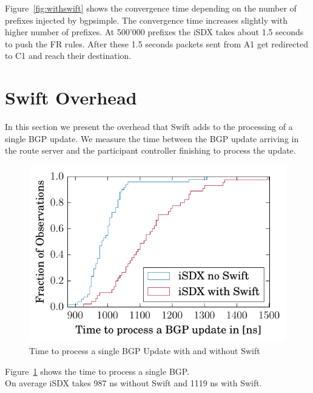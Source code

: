 Figure~\ref{fig:withswift} shows the convergence time depending on the number of prefixes injected by bgpsimple.
The convergence time increases slightly with higher number of prefixes. At 500'000 prefixes the iSDX takes about 1.5 seconds to push the FR rules. After these 1.5 seconds packets sent from A1 get redirected to C1 and reach their destination. \\

\section{\label{chapter4:Swift overhead}Swift Overhead}

In this section we present the overhead that Swift adds to the processing of a single BGP update. We measure the time between the BGP update arriving in the route server and the participant controller finishing to process the update. 

\begin{figure}[h]
\center
\includegraphics[scale = 1]{Figures/results_overhead.pdf}
\caption{Time to process a single BGP Update with and without Swift}
\label{fig:swiftoverhead}
\end{figure}

Figure~\ref{fig:swiftoverhead} shows the time to process a single BGP. \\On average iSDX takes 987 ns without Swift and 1119 ns with Swift.

\newpage